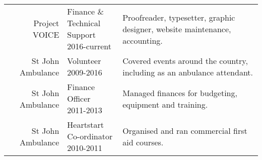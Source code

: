 \documentclass[letterpaper]{deedy-resume} %
\begin{document}
\begin{minipage}[t]{0.66\textwidth}
\begin{tabular}{rlm{6cm}}
Project VOICE & \makecell[l]{Finance \& \\ Technical Support \\  2016-current} & Proofreader, typesetter, graphic designer, website maintenance, accounting. \\
St John Ambulance & \makecell[l]{Volunteer \\ 2009-2016} & Covered events around the country, including as an anbulance attendant. \\
St John Ambulance & \makecell[l]{Finance Officer \\ 2011-2013} &
Managed finances for budgeting, equipment and training. \\
St John Ambulance & \makecell[l]{Heartstart \\ Co-ordinator \\ 2010-2011} &
Organised and ran commercial first aid courses. \\
\end{tabular}



\end{minipage} %








\end{document}
